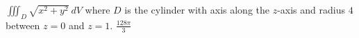 {$\iiint_D \sqrt{x^2 + y^2} \: dV$ where $D$ is the cylinder with axis along the $z$-axis and radius $4$ between $z=0$ and $z=1$.
}
{$\frac{128\pi}{3}$}
